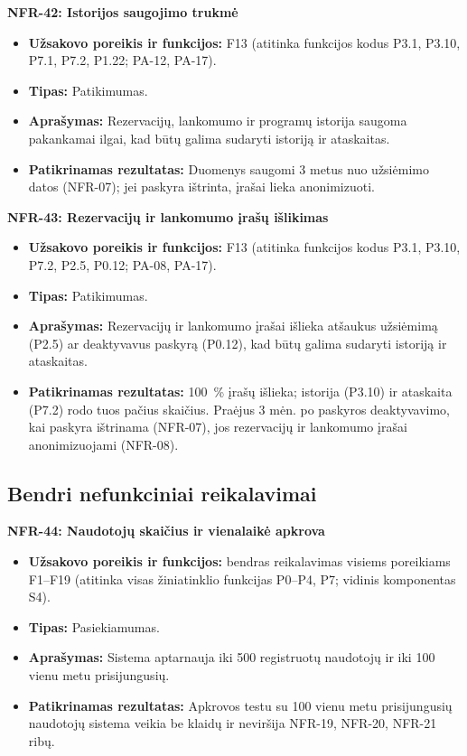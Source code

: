 \noindent\textbf{NFR-42: Istorijos saugojimo trukmė}
\begin{itemize}
    \item \textbf{Užsakovo poreikis ir funkcijos:} F13 (atitinka funkcijos kodus P3.1, P3.10, P7.1, P7.2, P1.22; PA-12, PA-17).
    \item \textbf{Tipas:} Patikimumas.
    \item \textbf{Aprašymas:} Rezervacijų, lankomumo ir programų istorija saugoma pakankamai ilgai, kad būtų galima sudaryti istoriją ir ataskaitas.
    \item \textbf{Patikrinamas rezultatas:} Duomenys saugomi 3 metus nuo užsiėmimo datos (NFR-07); jei paskyra ištrinta, įrašai lieka anonimizuoti.
\end{itemize}


\noindent\textbf{NFR-43: Rezervacijų ir lankomumo įrašų išlikimas}
\begin{itemize}
    \item \textbf{Užsakovo poreikis ir funkcijos:} F13 (atitinka funkcijos kodus P3.1, P3.10, P7.2, P2.5, P0.12; PA-08, PA-17).
    \item \textbf{Tipas:} Patikimumas.
    \item \textbf{Aprašymas:} Rezervacijų ir lankomumo įrašai išlieka atšaukus užsiėmimą (P2.5) ar deaktyvavus paskyrą (P0.12), kad būtų galima sudaryti istoriją ir ataskaitas.
    \item \textbf{Patikrinamas rezultatas:} 100~\% įrašų išlieka; istorija (P3.10) ir ataskaita (P7.2) rodo tuos pačius skaičius. Praėjus 3 mėn. po paskyros deaktyvavimo, kai paskyra ištrinama (NFR-07), jos rezervacijų ir lankomumo įrašai anonimizuojami (NFR-08).
\end{itemize}


\subsection{Bendri nefunkciniai reikalavimai}

\noindent\textbf{NFR-44: Naudotojų skaičius ir vienalaikė apkrova}
\begin{itemize}
    \item \textbf{Užsakovo poreikis ir funkcijos:} bendras reikalavimas visiems poreikiams F1--F19 (atitinka visas žiniatinklio funkcijas P0--P4, P7; vidinis komponentas S4).
    \item \textbf{Tipas:} Pasiekiamumas.
    \item \textbf{Aprašymas:} Sistema aptarnauja iki 500 registruotų naudotojų ir iki 100 vienu metu prisijungusių.
    \item \textbf{Patikrinamas rezultatas:} Apkrovos testu su 100 vienu metu prisijungusių naudotojų sistema veikia be klaidų ir neviršija NFR-19, NFR-20, NFR-21 ribų.
\end{itemize}

